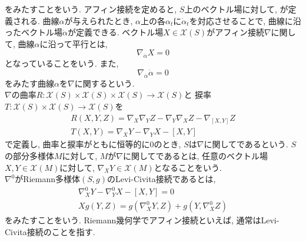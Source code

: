 \documentclass{jsarticle}
\theoremstyle{definition}
\renewcommand{\emph}[1]{\textbf{\textgt{#1}}}
\begin{document}
   をみたすことをいう. 
   アフィン接続を定めると, $S$上のベクトル場に対して, \emph{平行}が定義される. 
   曲線$\alpha$が与えられたとき, $\alpha$上の各$\alpha_t$に$\dot{\alpha}_t$を対応させることで, 
   曲線に沿ったベクトル場$\dot{\alpha}$が定義できる. 
   ベクトル場$X\in\mathcal{X}(S)$がアフィン接続$\nabla$に関して, 曲線$\alpha$に沿って平行とは, 
   \[
           \nabla_{\dot{\alpha}}X=0
   \]
   となっていることをいう. 
   また, 
   \[
           \nabla_{\dot{\alpha}}\dot{\alpha}=0
   \]
   をみたす曲線$\alpha$を$\nabla$に関する\emph{測地線}という.\\
   $\nabla$の曲率$R\colon \mathcal{X}(S) \times \mathcal{X}(S) \times \mathcal{X}(S) \to \mathcal{X}(S)$と
   捩率$T\colon \mathcal{X}(S) \times \mathcal{X}(S) \to \mathcal{X}(S)$を
   \begin{gather*}
           R(X,Y,Z)=\nabla_X\nabla_Y Z - \nabla_Y\nabla_X Z - \nabla_{[X,Y]}Z \\
        T(X,Y)=\nabla_X Y- \nabla_Y X - [X,Y] 
   \end{gather*}
   で定義し, 曲率と捩率がともに恒等的に$0$のとき, $S$は$\nabla$に関して\emph{平坦}であるという. 
   $S$の部分多様体$M$に対して, $M$が$\nabla$に関して\emph{自己平行}であるとは, 
   任意のベクトル場$X,Y\in \mathcal{X}(M)$に対して, 
   $\nabla_X Y\in \mathcal{X}(M)$となることをいう.\\
   $\nabla^0$がRiemann多様体$(S,g)$のLevi-Civita接続であるとは, 
   \begin{gather*}
           \nabla^0_X Y - \nabla^0_Y X - [X,Y]=0\\
        Xg(Y,Z)=g(\nabla^0_X Y, Z) + g(Y,\nabla^0_X Z)
   \end{gather*}
   をみたすことをいう. Riemann幾何学でアフィン接続といえば, 通常はLevi-Civita接続のことを指す.
   
\end{document}
